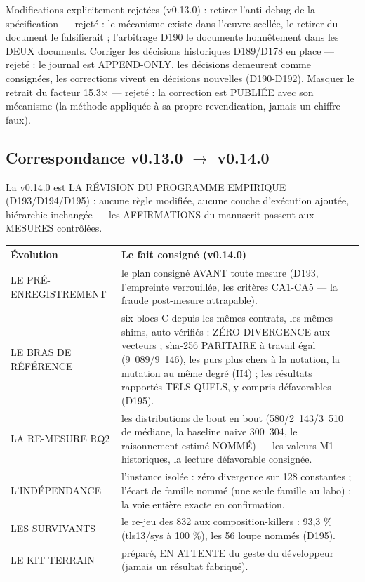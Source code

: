 Modifications explicitement rejetées (v0.13.0) : retirer l'anti-debug de la
spécification — rejeté : le mécanisme existe dans l'œuvre scellée, le retirer
du document le falsifierait ; l'arbitrage D190 le documente honnêtement dans
les DEUX documents. Corriger les décisions historiques D189/D178 en place —
rejeté : le journal est APPEND-ONLY, les décisions demeurent comme consignées,
les corrections vivent en décisions nouvelles (D190-D192). Masquer le retrait
du facteur 15,3× — rejeté : la correction est PUBLIÉE avec son mécanisme (la
méthode appliquée à sa propre revendication, jamais un chiffre faux).

\subsection{Correspondance v0.13.0 $\to$ v0.14.0}\label{sec:evolutions140}

La v0.14.0 est LA RÉVISION DU PROGRAMME EMPIRIQUE (D193/D194/D195) :
aucune règle modifiée, aucune couche d'exécution ajoutée, hiérarchie
inchangée — les AFFIRMATIONS du manuscrit passent aux MESURES contrôlées.

\begin{table}[tbp]
\centering
\small
\begin{tabularx}{\textwidth}{>{\raggedright\arraybackslash}p{3.4cm} X}
\textbf{Évolution} & \textbf{Le fait consigné (v0.14.0)} \\
\midrule
LE PRÉ-ENREGISTREMENT & le plan consigné AVANT toute mesure (D193,
l'empreinte verrouillée, les critères CA1-CA5 — la fraude post-mesure
attrapable). \\
LE BRAS DE RÉFÉRENCE & six blocs C depuis les mêmes contrats, les mêmes
shims, auto-vérifiés : ZÉRO DIVERGENCE aux vecteurs ; sha-256 PARITAIRE
à travail égal (9~089/9~146), les purs plus chers à la notation, la
mutation au même degré (H4) ; les résultats rapportés TELS QUELS,
y compris défavorables (D195). \\
LA RE-MESURE RQ2 & les distributions de bout en bout (580/2~143/3~510 de
médiane, la baseline naive 300~304, le raisonnement estimé NOMMÉ) — les
valeurs M1 historiques, la lecture défavorable consignée. \\
L'INDÉPENDANCE & l'instance isolée : zéro divergence sur 128 constantes ;
l'écart de famille nommé (une seule famille au labo) ; la voie entière
exacte en confirmation. \\
LES SURVIVANTS & le re-jeu des 832 aux composition-killers : 93,3 \%
(tls13/sys à 100 \%), les 56 loupe nommés (D195). \\
LE KIT TERRAIN & préparé, EN ATTENTE du geste du développeur (jamais un
résultat fabriqué). \\
\end{tabularx}
\end{table}

